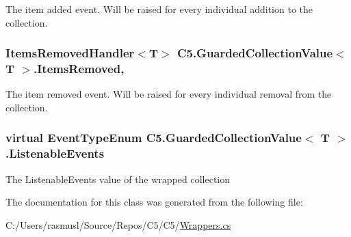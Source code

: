 The item added event. Will be raised for every individual addition to the collection. 

\hypertarget{class_c5_1_1_guarded_collection_value_a85c761ac148d451a9bfc35647c4828fe}{}
\subsubsection[{Items\+Removed}]{\setlength{\rightskip}{0pt plus 5cm}Items\+Removed\+Handler$<$T$>$ {\bf C5.\+Guarded\+Collection\+Value}$<$ T $>$.Items\+Removed\hspace{0.3cm}{\ttfamily [add]}, {\ttfamily [remove]}}\label{class_c5_1_1_guarded_collection_value_a85c761ac148d451a9bfc35647c4828fe}


The item removed event. Will be raised for every individual removal from the collection. 

\hypertarget{class_c5_1_1_guarded_collection_value_ae25ccc848da34d751250986e82f56faa}{}
\subsubsection[{Listenable\+Events}]{\setlength{\rightskip}{0pt plus 5cm}virtual {\bf Event\+Type\+Enum} {\bf C5.\+Guarded\+Collection\+Value}$<$ T $>$.Listenable\+Events\hspace{0.3cm}{\ttfamily [get]}}\label{class_c5_1_1_guarded_collection_value_ae25ccc848da34d751250986e82f56faa}


The Listenable\+Events value of the wrapped collection 



The documentation for this class was generated from the following file\+:\begin{DoxyCompactItemize}
\item 
C\+:/\+Users/rasmusl/\+Source/\+Repos/\+C5/\+C5/\hyperlink{_wrappers_8cs}{Wrappers.\+cs}\end{DoxyCompactItemize}
